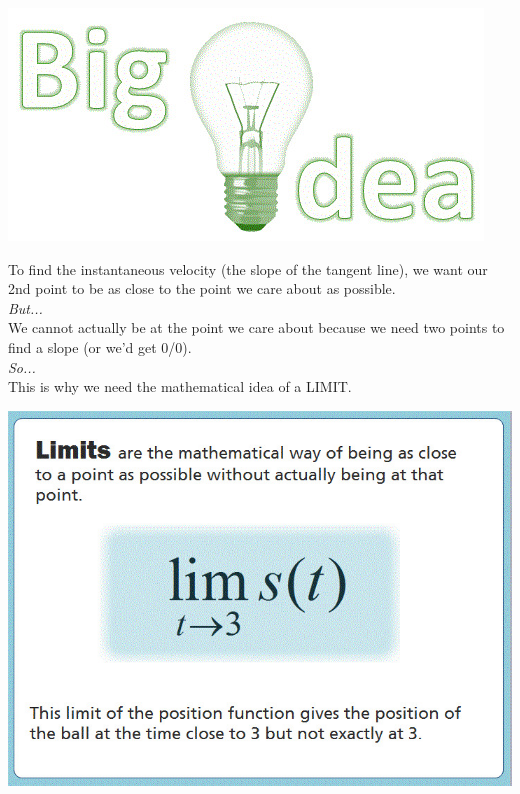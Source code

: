 \documentclass{ximera}
\begin{document}
\begin{image}
\includegraphics{bigidea.jpg}
\end{image}
To find the instantaneous velocity (the slope of the tangent line), we want our 2nd point to be as close to the point we care about as possible. \\
\textit{But...} \\
We cannot actually be at the point we care about because we need two points to find a slope (or we'd get 0/0). \\
\textit{So...} \\
This is why we need the mathematical idea of a LIMIT.

\begin{image}
\includegraphics{picture7.jpg}
\end{image}

\end{document}
